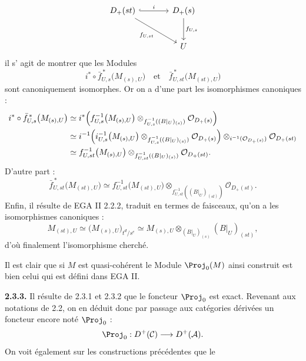 \[
\begin{tikzcd}[column sep=large,row sep=large]
D_+(st) \arrow[r,hook,"i"] \arrow[dr,"f_{U,st}"'] &
D_+(s) \arrow[d,"f_{U,s}"]\\
& U
\end{tikzcd}
\]
il s'%
agit de montrer que les Modules
\[
  i^*\circ\bar f_{U,s}^{\,*}\bigl(M_{(s),U}\bigr)
  \quad\text{et}\quad
  \bar f_{U,st}^{\,*}\bigl(M_{(st),U}\bigr)
\]
sont canoniquement isomorphes. Or on a d'une part les isomorphismes canoniques :
\[
\begin{aligned}
i^*\circ\bar f_{U,s}^{\,*}\bigl(M_{(s),U}\bigr)
&\simeq
i^*\Bigl(f_{U,s}^{-1}\bigl(M_{(s),U}\bigr)
 \otimes_{f_{U,s}^{-1}((B|_U)_{(s)})}\mathcal O_{D_+(s)}\Bigr)\\
&\simeq
i^{-1}\Bigl(i_{U,s}^{-1}\bigl(M_{(s),U}\bigr)
 \otimes_{f_{U,s}^{-1}((B|_U)_{(s)})}\mathcal O_{D_+(s)}\Bigr)
 \otimes_{i^{-1}(\mathcal O_{D_+(s)})}\mathcal O_{D_+(st)}\\
&\simeq
f_{U,st}^{-1}\bigl(M_{(s),U}\bigr)
 \otimes_{f_{U,st}^{-1}((B|_U)_{(s)})}\mathcal O_{D_+(st)} .
\end{aligned}
\]
D'autre part :
\[
  \bar f_{U,st}^{\,*}\bigl(M_{(st),U}\bigr)
  \simeq
  f_{U,st}^{-1}\bigl(M_{(st),U}\bigr)
  \otimes_{f_{U,st}^{-1}((B|_U)_{(st)})}\mathcal O_{D_+(st)} .
\]
Enfin, il résulte de EGA II 2.2.2, traduit en termes de faisceaux, qu'on a les isomorphismes canoniques :
\[
  M_{(st),U}\simeq
  \bigl(M_{(s),U}\bigr)_{t^d/s^e}
  \simeq
  M_{(s),U}\otimes_{(B|_U)_{(s)}}(B|_U)_{(st)},
\]
d'où finalement l'isomorphisme cherché.

Il est clair que si \(M\) est quasi-cohérent le Module \(\Proj_0(M)\) ainsi construit est bien celui qui est défini dans EGA II.

\textbf{2.3.3.} Il résulte de 2.3.1 et 2.3.2 que le foncteur \(\Proj_0\) est exact. Revenant aux notations de 2.2, on en déduit donc par passage aux catégories dérivées un foncteur encore noté \(\Proj_0\) :
\[
  \Proj_0:D^+(\mathcal C)\longrightarrow D^+(\mathcal A).
\]
On voit également sur les constructions précédentes que le
